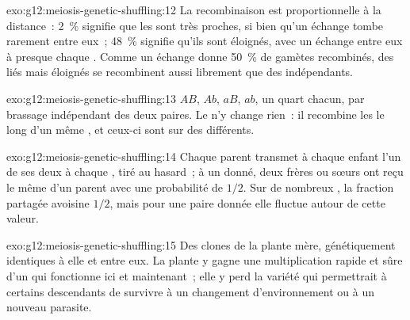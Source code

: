 \begin{solution}{exo:g12:meiosis-genetic-shuffling:12}
La recombinaison est proportionnelle à la distance~: 2~\% signifie que
les  sont très proches, si bien qu'un échange tombe rarement entre
eux~; 48~\% signifie qu'ils sont éloignés, avec un échange entre eux à
presque chaque . Comme un échange donne 50~\% de gamètes
recombinés, des  liés mais éloignés se recombinent aussi
librement que des  indépendants.
\end{solution}

\begin{solution}{exo:g12:meiosis-genetic-shuffling:13}
$AB$, $Ab$, $aB$, $ab$, un quart chacun, par brassage indépendant des
deux paires. Le  n'y change rien~: il recombine les
 le long d'un même , et ceux-ci sont sur des
 différents.
\end{solution}

\begin{solution}{exo:g12:meiosis-genetic-shuffling:14}
Chaque parent transmet à chaque enfant l'un de ses deux  à
chaque , tiré au hasard~; à un  donné, deux frères ou sœurs ont
reçu le même  d'un parent avec une probabilité de $1/2$. Sur de
nombreux , la fraction partagée avoisine $1/2$, mais pour une
paire donnée elle fluctue autour de cette valeur.
\end{solution}

\begin{solution}{exo:g12:meiosis-genetic-shuffling:15}
Des clones de la plante mère, génétiquement identiques à elle et entre
eux. La plante y gagne une multiplication rapide et sûre d'un 
qui fonctionne ici et maintenant~; elle y perd la variété qui
permettrait à certains descendants de survivre à un changement
d'environnement ou à un nouveau parasite.
\end{solution}

